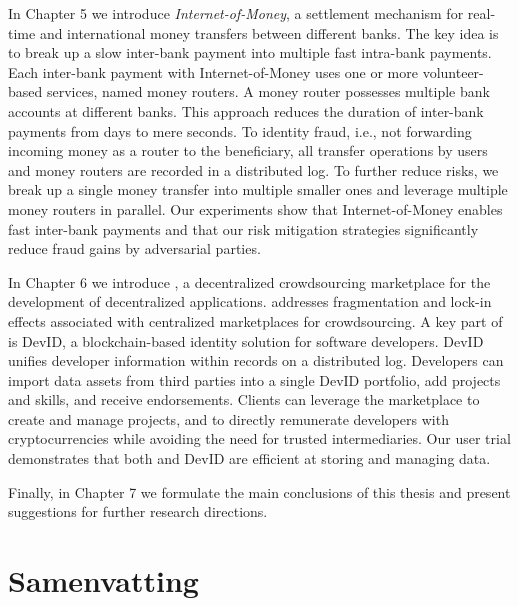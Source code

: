 In Chapter 5 we introduce \emph{Internet-of-Money}, a settlement mechanism for real-time and international money transfers between different banks.
The key idea is to break up a slow inter-bank payment into multiple fast intra-bank payments.
Each inter-bank payment with Internet-of-Money uses one or more volunteer-based services, named money routers.
A money router possesses multiple bank accounts at different banks.
This approach reduces the duration of inter-bank payments from days to mere seconds.
To identity fraud, i.e., not forwarding incoming money as a router to the beneficiary, all transfer operations by users and money routers are recorded in a distributed log.
To further reduce risks, we break up a single money transfer into multiple smaller ones and leverage multiple money routers in parallel.
Our experiments show that Internet-of-Money enables fast inter-bank payments and that our risk mitigation strategies significantly reduce fraud gains by adversarial parties.

In Chapter 6 we introduce \emph{\Dappcoder{}}, a decentralized crowdsourcing marketplace for the development of decentralized applications.
\Dappcoder{} addresses fragmentation and lock-in effects associated with centralized marketplaces for crowdsourcing.
A key part of \Dappcoder{} is DevID, a blockchain-based identity solution for software developers.
DevID unifies developer information within records on a distributed log.
Developers can import data assets from third parties into a single DevID portfolio, add projects and skills, and receive endorsements.
Clients can leverage the \Dappcoder{} marketplace to create and manage projects, and to directly remunerate developers with cryptocurrencies while avoiding the need for trusted intermediaries.
Our user trial demonstrates that both \Dappcoder{} and DevID are efficient at storing and managing data.

Finally, in Chapter 7 we formulate the main conclusions of this thesis and present suggestions for further research directions.

\chapter*{Samenvatting}

